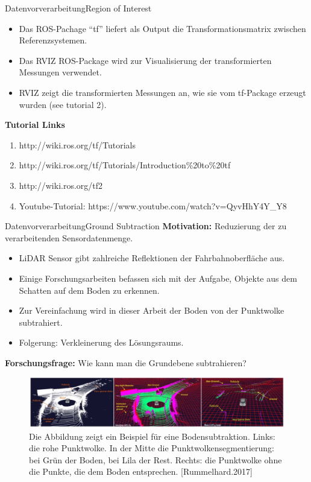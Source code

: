 \documentclass[169, handout	]{THIbeamer} %
\begin{document}
	\begin{frame}{Datenvorverarbeitung}{Region of Interest}
		\footnotesize
		\begin{itemize}
			\item Das ROS-Pachage \enquote{tf} liefert als Output die Transformationsmatrix zwischen Referenzsystemen.
			\item Das RVIZ ROS-Package wird zur Visualisierung der transformierten Messungen verwendet.
			\item RVIZ zeigt die transformierten Messungen an, wie sie vom tf-Package erzeugt wurden (see tutorial 2).
		\end{itemize}
		\textbf{Tutorial Links}
		\begin{enumerate}
			\item http://wiki.ros.org/tf/Tutorials
			\item http://wiki.ros.org/tf/Tutorials/Introduction\%20to\%20tf
			\item http://wiki.ros.org/tf2
			\item Youtube-Tutorial: https://www.youtube.com/watch?v=QyvHhY4Y\_Y8
		\end{enumerate}
	\end{frame}
	\begin{frame}{Datenvorverarbeitung}{Ground Subtraction}
		\footnotesize
		\textbf{Motivation:} Reduzierung der zu verarbeitenden Sensordatenmenge.
		\begin{itemize}
			\item LiDAR Sensor gibt zahlreiche Reflektionen der Fahrbahnoberfläche aus.
			\item Einige Forschungsarbeiten befassen sich mit der Aufgabe, Objekte aus dem Schatten auf dem Boden zu erkennen.\\
			\item Zur Vereinfachung wird in dieser Arbeit der Boden von der Punktwolke subtrahiert. 
			\item Folgerung: Verkleinerung des Lösungsraums.		
		\end{itemize}	
	\textbf{Forschungsfrage:} Wie kann man die Grundebene subtrahieren? 
		\begin{figure}
			\includegraphics[scale=0.33]{required/Ground Subtraction.jpg}
			\caption{Die Abbildung zeigt ein Beispiel für eine Bodensubtraktion. Links: die rohe Punktwolke. In der Mitte die Punktwolkensegmentierung: bei Grün der Boden, bei Lila der Rest. Rechts: die Punktwolke ohne die Punkte, die dem Boden entsprechen. [Rummelhard.2017]}
        	\label{Ground Subtraction}
       	\end{figure}
	\end{frame}
\end{document}
